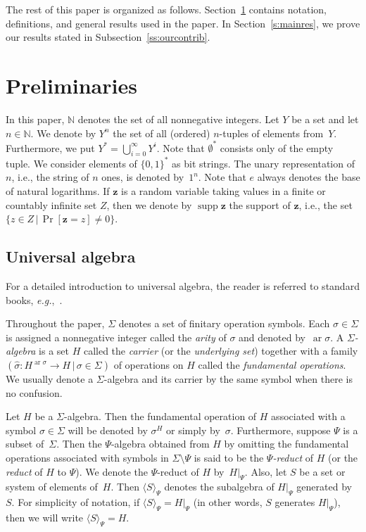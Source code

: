 \documentclass{jgcc}
\DeclareMathOperator{\ar}{ar}
\DeclareMathOperator{\supp}{supp}
\newcommand{\B}{\{0,1\}}
\newcommand{\st}{\,|\,}
\newcommand{\alg}[1]{\langle#1\rangle}
\newcommand{\N}{\mathbb N}
\newcommand{\rv}{\mathbf}
\newcommand{\Prob}[1]{\Pr[#1]}
\newcommand{\eg}{\emph{e.g.}}
\begin{document}
The rest of this paper is organized as follows.
Section~\ref{s:prelim} contains notation, definitions, and
general results used in the paper. In
Section~\ref{s:mainres}, we prove our results stated in
Subsection~\ref{ss:ourcontrib}.

\section{Preliminaries}
\label{s:prelim}

In this paper, $\N$ denotes the set of all nonnegative
integers. Let $Y$ be a set and let $n\in\N$. We denote by
$Y^n$ the set of all (ordered) $n$-tuples of elements
from~$Y$. Furthermore, we put $Y^*=\bigcup_{i=0}^\infty
Y^i$. Note that $\emptyset^*$ consists only of the empty
tuple. We consider elements of $\B^*$ as bit strings. The
unary representation of $n$, i.e., the string of $n$ ones,
is denoted by~$1^n$. Note that $e$ always denotes the base
of natural logarithms. If $\rv z$ is a random variable
taking values in a finite or countably infinite set $Z$,
then we denote by $\supp\rv z$ the support of $\rv z$, i.e.,
the set $\{z\in Z\st\Prob{\rv z=z}\ne0\}$.

\subsection{Universal algebra}

For a detailed introduction to universal algebra, the reader
is referred to standard books, \eg,~\cite{Cohn81, Wech92}.

Throughout the paper, $\Sigma$ denotes a set of finitary
operation symbols. Each $\sigma\in\Sigma$ is assigned a
nonnegative integer called the \emph{arity} of $\sigma$ and
denoted by~$\ar\sigma$. A \emph{$\Sigma$-algebra} is a set
$H$ called the \emph{carrier} (or the \emph{underlying set})
together with a family $(\widehat\sigma\colon
H^{\ar\sigma}\to H\st\sigma\in\Sigma)$ of operations on $H$
called the \emph{fundamental operations}. We usually denote
a $\Sigma$-algebra and its carrier by the same symbol when
there is no confusion.

Let $H$ be a $\Sigma$-algebra. Then the fundamental
operation of $H$ associated with a symbol $\sigma\in\Sigma$
will be denoted by $\sigma^H$ or simply by~$\sigma$.
Furthermore, suppose $\Psi$ is a subset of~$\Sigma$. Then
the $\Psi$-algebra obtained from $H$ by omitting the
fundamental operations associated with symbols in
$\Sigma\setminus\Psi$ is said to be the \emph{$\Psi$-reduct}
of $H$ (or the \emph{reduct} of $H$ to $\Psi$). We denote
the $\Psi$-reduct of $H$ by~$H|_\Psi$. Also, let $S$ be a
set or system of elements of~$H$. Then $\alg S_\Psi$ denotes
the subalgebra of $H|_\Psi$ generated by~$S$. For simplicity
of notation, if $\alg S_\Psi=H|_\Psi$ (in other words, $S$
generates $H|_\Psi$), then we will write $\alg S_\Psi=H$.
\end{document}
